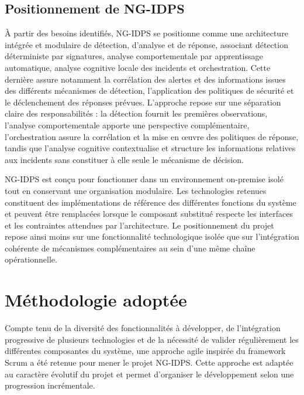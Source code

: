 \subsection{Positionnement de NG-IDPS}

À partir des besoins identifiés, NG-IDPS se positionne comme une architecture intégrée et modulaire de détection, d'analyse et de réponse, associant détection déterministe par signatures, analyse comportementale par apprentissage automatique, analyse cognitive locale des incidents et orchestration. Cette dernière assure notamment la corrélation des alertes et des informations issues des différents mécanismes de détection, l'application des politiques de sécurité et le déclenchement des réponses prévues. L'approche repose sur une séparation claire des responsabilités : la détection fournit les premières observations, l'analyse comportementale apporte une perspective complémentaire, l'orchestration assure la corrélation et la mise en œuvre des politiques de réponse, tandis que l'analyse cognitive contextualise et structure les informations relatives aux incidents sans constituer à elle seule le mécanisme de décision.

NG-IDPS est conçu pour fonctionner dans un environnement on-premise isolé tout en conservant une organisation modulaire. Les technologies retenues constituent des implémentations de référence des différentes fonctions du système et peuvent être remplacées lorsque le composant substitué respecte les interfaces et les contraintes attendues par l'architecture. Le positionnement du projet repose ainsi moins sur une fonctionnalité technologique isolée que sur l'intégration cohérente de mécanismes complémentaires au sein d'une même chaîne opérationnelle.





\section{Méthodologie adoptée}


Compte tenu de la diversité des fonctionnalités à développer, de l'intégration progressive de plusieurs technologies et de la nécessité de valider régulièrement les différentes composantes du système, une approche agile inspirée du framework Scrum a été retenue pour mener le projet NG-IDPS. Cette approche est adaptée au caractère évolutif du projet et permet d'organiser le développement selon une progression incrémentale.

